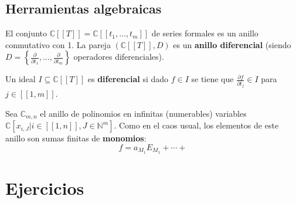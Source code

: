 \documentclass[12pt]{report}
\theoremstyle{largebreak}
\newcommand\natint[1]{\ensuremath{\left[\!\left[ #1\right]\!\right]}}
\begin{document}
    \section{Herramientas algebraicas}

    \begin{mydef}
        El conjunto $\mathbb{C}[[T]]=\mathbb{C}[[t_1,...,t_m]]$ de series formales es un anillo conmutativo con 1. La pareja $(\mathbb{C}[[T]],D)$ es un \textbf{anillo diferencial} (siendo $D=\left\{\frac{\partial}{\partial t_1},...,\frac{\partial}{\partial t_m} \right\}$ operadores diferenciales).

        Un ideal $I\subseteq\mathbb{C}[[T]]$ es \textbf{diferencial} si dado $f\in I$ se tiene que $\frac{\partial f}{\partial t_j}\in I$ para $j\in\natint{1,m}$.
    \end{mydef}

    Sea $\mathbb{C}_{ m,n}$ el anillo de polinomios en infinitas (numerables) variables $\mathbb{C}[x_{ i,J}\Big| i\in\natint{1,n}, J\in\mathbb{N}^m]$. Como en el caos usual, los elementos de este anillo son sumas finitas de \textbf{monomios}:
    \begin{equation*}
        f=a_{M_1}E_{ M_1}+\cdots+
    \end{equation*}

    \chapter{Ejercicios}
\end{document}
